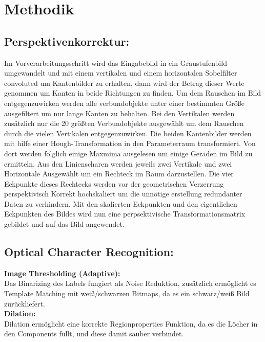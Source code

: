 \documentclass[paper=A4, deutsch]{scrartcl}
\begin{document}

\section{Methodik}
\subsection{Perspektivenkorrektur:}
Im Vorverarbeitungsschritt wird das Eingabebild in ein Graustufenbild umgewandelt und mit einem vertikalen und einem horizontalen Sobelfilter convoluted um Kantenbilder zu erhalten, dann wird der Betrag dieser Werte genommen um Kanten in beide Richtungen zu finden. Um dem Rauschen im Bild entgegenzuwirken werden alle verbundobjekte unter einer bestimmten Größe ausgefiltert um nur lange Kanten zu behalten. Bei den Vertikalen werden zusätzlich nur die 20 größten Verbundobjekte ausgewählt um dem Rauschen durch die vielen Vertikalen entgegenzuwirken.
Die beiden Kantenbilder werden mit hilfe einer Hough-Transformation in den Parameterraum transformiert. Von dort werden folglich einige Maxmima ausgelesen um einige Geraden im Bild zu ermitteln.
Aus den Linienscharen werden jeweils zwei Vertikale und zwei Horizontale Ausgewählt um ein Rechteck im Raum darzustellen. Die vier Eckpunkte dieses Rechtecks werden vor der geometrischen Verzerrung perspektivisch Korrekt hochskaliert um die unnötige erstellung redundanter Daten zu verhindern. Mit den skalierten Eckpunkten und den eigentlichen Eckpunkten des Bildes wird nun eine perpsektivische Transformationsmatrix gebildet und auf das Bild angewendet.\\

\subsection{Optical Character Recognition:}
\textbf{Image Thresholding (Adaptive):}\\
Das Binarizing des Labels fungiert als Noise Reduktion, zusätzlich ermöglicht es Template Matching mit weiß/schwarzen Bitmaps, da es ein schwarz/weiß Bild zurückliefert.\\

\textbf{Dilation:}\\
Dilation ermöglicht eine korrekte Regionproperties Funktion, da es die Löcher in den Components füllt, und diese damit sauber verbindet.\\
\end{document}
